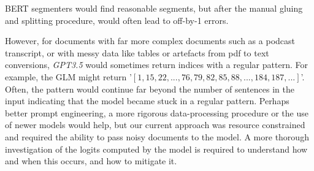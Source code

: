 BERT segmenters would find reasonable segments, but after the manual gluing and splitting procedure, would often lead to off-by-1 errors.

However, for documents with far more complex documents such as a podcast transcript, or with messy data like tables or artefacts from pdf to text conversions, \emph{GPT3.5} would sometimes return indices with a regular pattern. For example, the GLM might return '$[1,15,22, ..., 76, 79, 82, 85, 88, ..., 184, 187, ...]$'. Often, the pattern would continue far beyond the number of sentences in the input indicating that the model became stuck in a regular pattern. Perhaps better prompt engineering, a more rigorous data-processing procedure or the use of newer models would help, but our current approach was resource constrained and required the ability to pass noisy documents to the model. A more thorough investigation of the logits computed by the model is required to understand how and when this occurs, and how to mitigate it.

